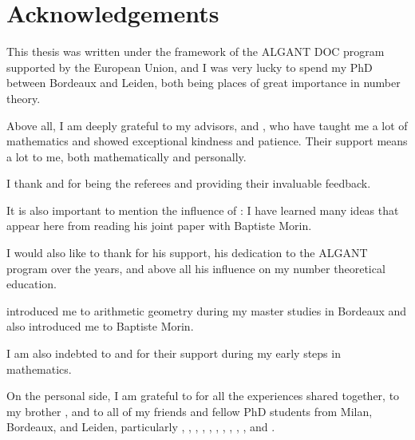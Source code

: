 \chapter*{Acknowledgements}

This thesis was written under the framework of the ALGANT DOC program supported
by the European Union, and I was very lucky to spend my PhD between Bordeaux and
Leiden, both being places of great importance in number theory.

Above all, I am deeply grateful to my advisors,  and
, who have taught me a lot of mathematics and showed
exceptional kindness and patience. Their support means a lot to me, both
mathematically and personally.

I thank  and
 for being the referees and providing their
invaluable feedback.

It is also important to mention the influence of :
I have learned many ideas that appear here from reading his joint paper with
Baptiste Morin.

I would also like to thank  for his support, his
dedication to the ALGANT program over the years, and above all his influence on
my number theoretical education.

 introduced me to arithmetic geometry during my master
studies in Bordeaux and also introduced me to Baptiste Morin.

I am also indebted to  and
 for their support during my early steps in
mathematics.

On the personal side, I am grateful to  for
all the experiences shared together, to my brother
, and to all of my friends and fellow PhD
students from Milan, Bordeaux, and Leiden, particularly
, ,
, ,
, ,
, ,
, , and
.

\pagebreak

